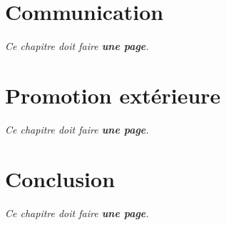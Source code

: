 \documentclass[francais]{rtxreport}
\begin{document}
\chapter{Communication}

\emph{Ce chapitre doit faire \textbf{une page}.}


\chapter{Promotion extérieure}

\emph{Ce chapitre doit faire \textbf{une page}.}


\chapter{Conclusion}

\emph{Ce chapitre doit faire \textbf{une page}.}

\end{document}
